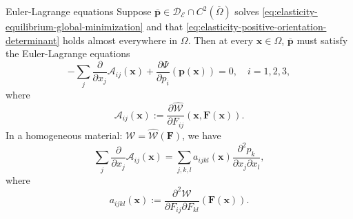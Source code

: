 \begin{Theorem}{Euler-Lagrange equations}
\label{thm:elasticity-euler-lagrange-equations}
Suppose $\overline{\bm{p}}\in\mathcal{D}_{\mathcal{E}}\cap C^2(\overline\Omega)$ solves \eqref{eq:elasticity-equilibrium-global-minimization} and that \eqref{eq:elasticity-positive-orientation-determinant} holds almost everywhere in $\Omega$. Then at every $\bm{x}\in\Omega$, $\overline{\bm{p}}$ must satisfy the Euler-Lagrange equations
\begin{equation}\label{eq:elasticity-euler-lagrange-equations}
-\sum_j\dfrac{\partial}{\partial x_j}\mathcal{A}_{ij}(\bm{x})+\dfrac{\partial\Psi}{\partial p_i}(\bm{p}(\bm{x}))=0,\quad i=1,2,3,
\end{equation}
where
\begin{equation}\label{eq:elasticity-euler-lagrange-stress-coefficients}
\mathcal{A}_{ij}(\bm{x}):=\dfrac{\partial\widehat{\mathcal{W}}}{\partial F_{ij}}(\bm{x},\bm{F}(\bm{x})).
\end{equation}
In a homogeneous material: $\mathcal{W}=\widehat{\mathcal{W}}(\bm{F})$, we have
\begin{equation}\label{eq:elasticity-homogeneous-stress-divergence}
\sum_j\dfrac{\partial}{\partial x_j}\mathcal{A}_{ij}(\bm{x})=\sum_{j,k,l}a_{ijkl}(\bm{x})\dfrac{\partial^2p_k}{\partial x_j\partial x_l},
\end{equation}
where
\begin{equation}\label{eq:elasticity-homogeneous-second-derivative-coefficients}
a_{ijkl}(\bm{x}):=\dfrac{\partial^2\mathcal{W}}{\partial F_{ij}\partial F_{kl}}(\bm{F}(\bm{x})).
\end{equation}

\end{Theorem}

